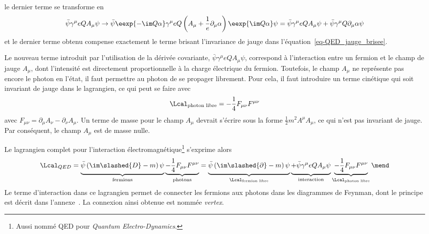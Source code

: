 le dernier terme se transforme en
\begin{equation}
\bar{\psi}\gamma^\mu eQA_\mu \psi
\to
\bar{\psi}\eexp{-\im Q\alpha}
\gamma^\mu
eQ\left(A_\mu + \frac{1}{e}\partial_\mu\alpha\right)
\eexp{\im Q\alpha}\psi
=
\bar{\psi} \gamma^\mu eQA_\mu \psi
+
\bar{\psi} \gamma^\mu  Q\partial_\mu\alpha \psi
\end{equation}
et le dernier terme obtenu compense exactement le terme brisant l'invariance de jauge dans l'équation~\eqref{eq-QED_jauge_brisee}.
\par Le nouveau terme introduit par l'utilisation de la dérivée covariante, $\bar{\psi}\gamma^\mu eQA_\mu \psi$, correspond à l'interaction entre un fermion et le champ de jauge $A_\mu$, dont l'intensité est directement proportionnelle à la charge électrique du fermion.
Toutefois, le champ $A_\mu$ ne représente pas encore le photon en l'état, il faut permettre au photon de se propager librement. Pour cela, il faut introduire un terme cinétique qui soit invariant de jauge dans le lagrangien, ce qui peut se faire avec
\begin{equation}
\Lcal_{\text{photon libre}} = - \frac{1}{4} F_{\mu\nu}F^{\mu\nu}
\end{equation}
avec $F_{\mu\nu} = \partial_\mu A_\nu - \partial_\nu A_\mu$.
Un terme de masse pour le champ $A_\mu$ devrait s'écrire sous la forme $\frac{1}{2}m^2A^\mu A_\mu$, ce qui n'est pas invariant de jauge. Par conséquent, le champ $A_\mu$ est de masse nulle.
\par Le lagrangien complet pour l'interaction électromagnétique\footnote{Aussi nommé QED pour \emph{Quantum Electro-Dynamics}.} s'exprime alors
\begin{equation}
\Lcal_{QED}
=
\underbrace{\bar{\psi} \left( \im\slashed{D} - m \right) \psi \vphantom{\frac{1}{4}}}_{\text{fermions}}
\underbrace{- \frac{1}{4} F_{\mu\nu}F^{\mu\nu} \vphantom{\frac{1}{4}}}_{\text{photons}}
=
\underbrace{\bar{\psi} \left( \im\slashed{\partial} - m \right) \psi \vphantom{\frac{1}{4}}}_{\Lcal_{\text{fermion libre}}}
\underbrace{+ \bar{\psi}\gamma^\mu eQA_\mu \psi \vphantom{\frac{1}{4}}}_{\text{interaction}}
\underbrace{- \frac{1}{4} F_{\mu\nu}F^{\mu\nu} \vphantom{\frac{1}{4}}}_{\Lcal_{\text{photon libre}}}
\mend
\end{equation}
Le terme d'interaction dans ce lagrangien permet de \og connecter \fg{} les fermions aux photons dans les diagrammes de Feynman, dont le principe est décrit dans l'annexe~.
La \og connexion \fg{} ainsi obtenue est nommée \emph{vertex}.
